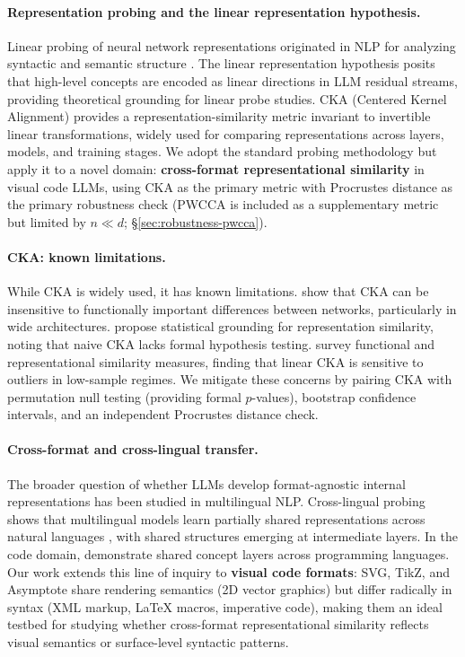\paragraph{Representation probing and the linear representation hypothesis.}
Linear probing of neural network representations originated in NLP for analyzing syntactic and semantic structure \cite{hewitt-manning-2019-structural, conneau-etal-2018-what}.
The linear representation hypothesis \cite{park2024linear} posits that high-level concepts are encoded as linear directions in LLM residual streams, providing theoretical grounding for linear probe studies.
CKA (Centered Kernel Alignment) \cite{kornblith2019similarity} provides a representation-similarity metric invariant to invertible linear transformations, widely used for comparing representations across layers, models, and training stages.
We adopt the standard probing methodology but apply it to a novel domain: \textbf{cross-format representational similarity} in visual code LLMs, using CKA as the primary metric with Procrustes distance as the primary robustness check (PWCCA \cite{morcos2018pwcca} is included as a supplementary metric but limited by $n \ll d$; \S\ref{sec:robustness-pwcca}).

\paragraph{CKA: known limitations.}
While CKA is widely used, it has known limitations.
\citet{nguyen2021wide} show that CKA can be insensitive to functionally important differences between networks, particularly in wide architectures.
\citet{ding2021grounding} propose statistical grounding for representation similarity, noting that naive CKA lacks formal hypothesis testing.
\citet{tang2020similarity} survey functional and representational similarity measures, finding that linear CKA is sensitive to outliers in low-sample regimes.
We mitigate these concerns by pairing CKA with permutation null testing (providing formal $p$-values), bootstrap confidence intervals, and an independent Procrustes distance check.

\paragraph{Cross-format and cross-lingual transfer.}
The broader question of whether LLMs develop format-agnostic internal representations has been studied in multilingual NLP.
Cross-lingual probing shows that multilingual models learn partially shared representations across natural languages \cite{pires-etal-2019-multilingual, wu-dredze-2019-beto}, with shared structures emerging at intermediate layers.
In the code domain, \citet{neuron-guided-2025} demonstrate shared concept layers across programming languages.
Our work extends this line of inquiry to \textbf{visual code formats}: SVG, TikZ, and Asymptote share rendering semantics (2D vector graphics) but differ radically in syntax (XML markup, \LaTeX{} macros, imperative code), making them an ideal testbed for studying whether cross-format representational similarity reflects visual semantics or surface-level syntactic patterns.

